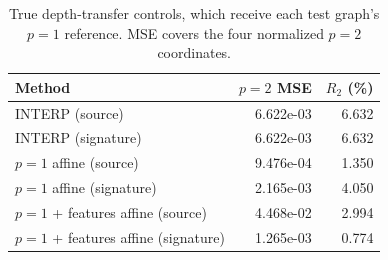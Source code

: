 \begin{table}[t]
\caption{\label{tab:depth}True depth-transfer controls, which receive each test graph's $p=1$ reference. MSE covers the four normalized $p=2$ coordinates.}
\centering\small
\begin{tabular}{lrr}
\toprule
Method & $p=2$ MSE & $R_2$ (\%)\\
\midrule
INTERP (source) & 6.622e-03 & 6.632\\
INTERP (signature) & 6.622e-03 & 6.632\\
$p=1$ affine (source) & 9.476e-04 & 1.350\\
$p=1$ affine (signature) & 2.165e-03 & 4.050\\
$p=1$ + features affine (source) & 4.468e-02 & 2.994\\
$p=1$ + features affine (signature) & 1.265e-03 & 0.774\\
\bottomrule
\end{tabular}
\end{table}
